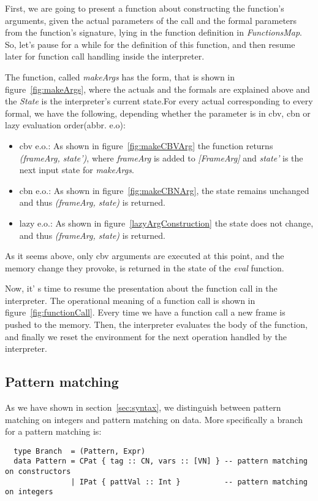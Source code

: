 \documentclass[diploma]{softlab-thesis}
\begin{document}

First, we are going to present a function about constructing the function's arguments, given the actual parameters of the call 
and the formal parameters from the function's signature, lying in the function definition in \textit{FunctionsMap}. So, let's 
pause for a while for the definition of this function, and then resume later for function call handling inside the 
interpreter.

The function, called \textit{makeArgs} has the form, that is shown in figure~\ref{fig:makeArgs},
where the actuals and the formals are explained above and the \textit{State} is the interpreter's 
current state.For every actual corresponding to every formal, we have the following, depending 
whether the parameter is in cbv, cbn or lazy evaluation order(abbr. e.o):
\begin{itemize}
  \item cbv e.o.: As shown in figure~\ref{fig:makeCBVArg} the function returns \textit{(frameArg, state')}, where 
  \textit{frameArg} is added to \textit{[FrameArg]} and \textit{state'} is the next input state for 
  \textit{makeArgs}. 
  \item cbn e.o.: As shown in figure~\ref{fig:makeCBNArg}, the state remains unchanged and thus 
  \textit{(frameArg, state)} is returned.
  \item lazy e.o.: As shown in figure~\ref{lazyArgConstruction} the state does not change, 
  and thus \textit{(frameArg, state)} is returned.  
\end{itemize}

As it seems above, only cbv arguments are executed at this point, and the memory change they provoke, 
is returned in the state of the \textit{eval} function.

Now, it' s time to resume the presentation about the function call in the interpreter.
The operational meaning of a function call is shown in figure~\ref{fig:functionCall}. 
Every time we have a function call a new frame is pushed to the memory. Then, the interpreter 
evaluates the body of the function, and finally we reset the environment for the next operation 
handled by the interpreter.



\subsection{Pattern matching}

As we have shown in section~\ref{sec:syntax}, we distinguish between pattern matching on integers and pattern matching on data. 
More specifically a branch for a pattern matching is:
\begin{verbatim}
  type Branch  = (Pattern, Expr)
  data Pattern = CPat { tag :: CN, vars :: [VN] } -- pattern matching on constructors 
               | IPat { pattVal :: Int }          -- pattern matching on integers 
\end{verbatim}
\end{document}
